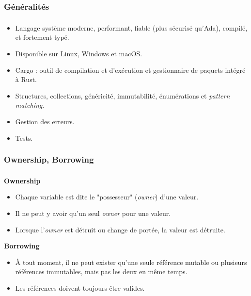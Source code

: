 \documentclass[10pt]{beamer}
\begin{document}
\subsubsection{Généralités}
\begin{frame}
    \frametitle{\subsecname}
    \framesubtitle{\subsubsecname}
    \begin{itemize}
        \item Langage système moderne, performant, fiable (plus sécurisé qu'Ada), compilé, et fortement typé.
        \pause
        \item Disponible sur Linux, Windows et macOS.
        \pause
        \item Cargo : outil de compilation et d'exécution et gestionnaire de paquets intégré à Rust.
        \pause
        \item Structures, collections, généricité, immutabilité, énumérations et \textit{pattern matching}.
        \pause
        \item Gestion des erreurs.
        \pause
        \item Tests.
    \end{itemize}
\end{frame}

\subsubsection{Ownership, Borrowing}
\begin{frame}
    \frametitle{\subsecname}
    \framesubtitle{\subsubsecname}
    \textbf{Ownership}
    \begin{itemize}
        \pause
        \item Chaque variable est dite le "possesseur" (\textit{owner}) d'une valeur.
        \pause
        \item Il ne peut y avoir qu'un seul \textit{owner} pour une valeur.
        \pause
        \item Lorsque l'\textit{owner} est détruit ou change de portée, la valeur est détruite.
    \end{itemize}
    \bigbreak
    \pause
    \textbf{Borrowing}
    \begin{itemize}
        \pause
        \item À tout moment, il ne peut exister qu'une seule référence mutable ou plusieurs 
            références immutables, mais pas les deux en même temps.
        \pause
        \item Les références doivent toujours être valides.
    \end{itemize}
\end{frame}
\end{document}
